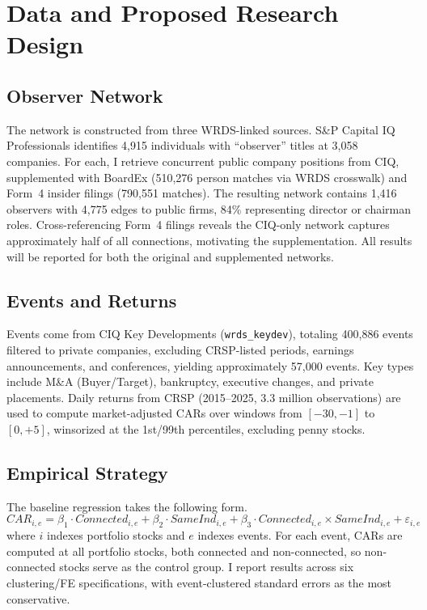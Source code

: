 \documentclass[12pt]{article}
\begin{document}
\section{Data and Proposed Research Design}
\label{sec:data}

\subsection{Observer Network}

The network is constructed from three WRDS-linked sources. S\&P Capital IQ Professionals identifies 4,915 individuals with ``observer'' titles at 3,058 companies. For each, I retrieve concurrent public company positions from CIQ, supplemented with BoardEx (510,276 person matches via WRDS crosswalk) and Form~4 insider filings (790,551 matches). The resulting network contains 1,416 observers with 4,775 edges to public firms, 84\% representing director or chairman roles. Cross-referencing Form~4 filings reveals the CIQ-only network captures approximately half of all connections, motivating the supplementation. All results will be reported for both the original and supplemented networks.

\subsection{Events and Returns}

Events come from CIQ Key Developments (\texttt{wrds\_keydev}), totaling 400,886 events filtered to private companies, excluding CRSP-listed periods, earnings announcements, and conferences, yielding approximately 57,000 events. Key types include M\&A (Buyer/Target), bankruptcy, executive changes, and private placements. Daily returns from CRSP (2015--2025, 3.3 million observations) are used to compute market-adjusted CARs over windows from $[-30,-1]$ to $[0,+5]$, winsorized at the 1st/99th percentiles, excluding penny stocks.

\subsection{Empirical Strategy}

The baseline regression takes the following form.
\begin{equation}
\label{eq:baseline}
CAR_{i,e} = \beta_1 \cdot Connected_{i,e} + \beta_2 \cdot SameInd_{i,e} + \beta_3 \cdot Connected_{i,e} \times SameInd_{i,e} + \varepsilon_{i,e}
\end{equation}
where $i$ indexes portfolio stocks and $e$ indexes events. For each event, CARs are computed at all portfolio stocks, both connected and non-connected, so non-connected stocks serve as the control group. I report results across six clustering/FE specifications, with event-clustered standard errors as the most conservative.
\end{document}

